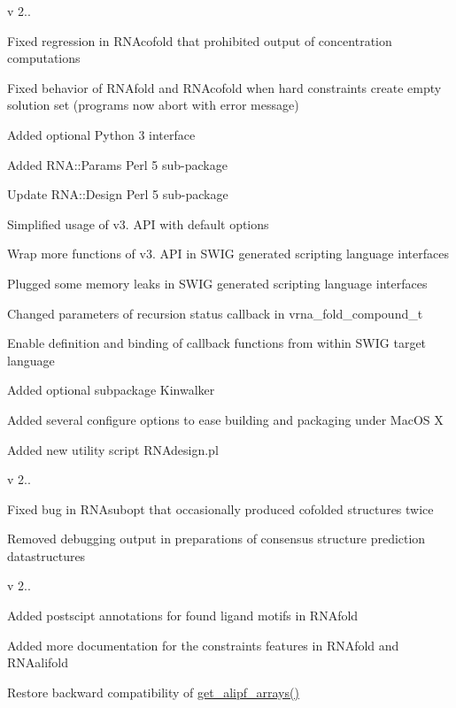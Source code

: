 v 2..
\begin{DoxyItemize}
\item Fixed regression in R\+N\+Acofold that prohibited output of concentration computations
\item Fixed behavior of R\+N\+Afold and R\+N\+Acofold when hard constraints create empty solution set (programs now abort with error message)
\item Added optional Python 3 interface
\item Added R\+N\+A\+::\+Params Perl 5 sub-\/package
\item Update R\+N\+A\+::\+Design Perl 5 sub-\/package
\item Simplified usage of v3. A\+PI with default options
\item Wrap more functions of v3. A\+PI in S\+W\+IG generated scripting language interfaces
\item Plugged some memory leaks in S\+W\+IG generated scripting language interfaces
\item Changed parameters of recursion status callback in vrna\+\_\+fold\+\_\+compound\+\_\+t
\item Enable definition and binding of callback functions from within S\+W\+IG target language
\item Added optional subpackage Kinwalker
\item Added several configure options to ease building and packaging under Mac\+OS X
\item Added new utility script R\+N\+Adesign.\+pl
\end{DoxyItemize}

v 2..
\begin{DoxyItemize}
\item Fixed bug in R\+N\+Asubopt that occasionally produced cofolded structures twice
\item Removed debugging output in preparations of consensus structure prediction datastructures
\end{DoxyItemize}

v 2..
\begin{DoxyItemize}
\item Added postscipt annotations for found ligand motifs in R\+N\+Afold
\item Added more documentation for the constraints features in R\+N\+Afold and R\+N\+Aalifold
\item Restore backward compatibility of \mbox{\hyperlink{group__consensus__fold_ga5349960075b1847720a2e9df021e2675}{get\+\_\+alipf\+\_\+arrays()}}
\end{DoxyItemize}


